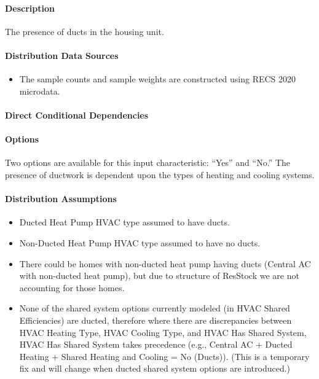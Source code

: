 \paragraph{Description}
% 
The presence of ducts in the housing unit.

\paragraph{Distribution Data Sources}
% 
\begin{itemize}
\item The sample counts and sample weights are constructed using RECS 2020 microdata.
\end{itemize}

\paragraph{Direct Conditional Dependencies}


\paragraph{Options}
Two options are available for this input characteristic: ``Yes'' and ``No.'' The presence of ductwork is dependent upon the types of heating and cooling systems.

\paragraph{Distribution Assumptions}
% 
\begin{itemize}
    \item Ducted Heat Pump HVAC type assumed to have ducts.
    \item Non-Ducted Heat Pump HVAC type assumed to have no ducts.
    \item There could be homes with non-ducted heat pump having ducts (Central AC with non-ducted heat pump), but due to structure of ResStock we are not accounting for those homes.
    \item None of the shared system options currently modeled (in HVAC Shared Efficiencies) are ducted, therefore where there are discrepancies between HVAC Heating Type, HVAC Cooling Type, and HVAC Has Shared System, HVAC Has Shared System takes precedence (e.g., Central AC + Ducted Heating + Shared Heating and Cooling = No (Ducts)). (This is a temporary fix and will change when ducted shared system options are introduced.)
\end{itemize}

